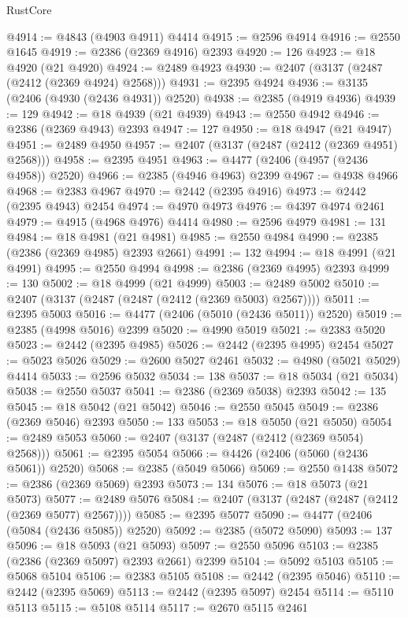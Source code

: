 \begin{lexlean}{RustCore}
\begin{coremodule}
@4914 := @4843 (@4903 @4911) @4414
@4915 := @2596 @4914
@4916 := @2550 @1645
@4919 := @2386 (@2369 @4916) @2393
@4920 := 126
@4923 := @18 @4920 (@21 @4920)
@4924 := @2489 @4923
@4930 := @2407 (@3137 (@2487 (@2412 (@2369 @4924) @2568)))
@4931 := @2395 @4924
@4936 := @3135 (@2406 (@4930 (@2436 @4931)) @2520)
@4938 := @2385 (@4919 @4936)
@4939 := 129
@4942 := @18 @4939 (@21 @4939)
@4943 := @2550 @4942
@4946 := @2386 (@2369 @4943) @2393
@4947 := 127
@4950 := @18 @4947 (@21 @4947)
@4951 := @2489 @4950
@4957 := @2407 (@3137 (@2487 (@2412 (@2369 @4951) @2568)))
@4958 := @2395 @4951
@4963 := @4477 (@2406 (@4957 (@2436 @4958)) @2520)
@4966 := @2385 (@4946 @4963) @2399
@4967 := @4938 @4966
@4968 := @2383 @4967
@4970 := @2442 (@2395 @4916)
@4973 := @2442 (@2395 @4943) @2454
@4974 := @4970 @4973
@4976 := @4397 @4974 @2461
@4979 := @4915 (@4968 @4976) @4414
@4980 := @2596 @4979
@4981 := 131
@4984 := @18 @4981 (@21 @4981)
@4985 := @2550 @4984
@4990 := @2385 (@2386 (@2369 @4985) @2393 @2661)
@4991 := 132
@4994 := @18 @4991 (@21 @4991)
@4995 := @2550 @4994
@4998 := @2386 (@2369 @4995) @2393
@4999 := 130
@5002 := @18 @4999 (@21 @4999)
@5003 := @2489 @5002
@5010 := @2407 (@3137 (@2487 (@2487 (@2412 (@2369 @5003) @2567))))
@5011 := @2395 @5003
@5016 := @4477 (@2406 (@5010 (@2436 @5011)) @2520)
@5019 := @2385 (@4998 @5016) @2399
@5020 := @4990 @5019
@5021 := @2383 @5020
@5023 := @2442 (@2395 @4985)
@5026 := @2442 (@2395 @4995) @2454
@5027 := @5023 @5026
@5029 := @2600 @5027 @2461
@5032 := @4980 (@5021 @5029) @4414
@5033 := @2596 @5032
@5034 := 138
@5037 := @18 @5034 (@21 @5034)
@5038 := @2550 @5037
@5041 := @2386 (@2369 @5038) @2393
@5042 := 135
@5045 := @18 @5042 (@21 @5042)
@5046 := @2550 @5045
@5049 := @2386 (@2369 @5046) @2393
@5050 := 133
@5053 := @18 @5050 (@21 @5050)
@5054 := @2489 @5053
@5060 := @2407 (@3137 (@2487 (@2412 (@2369 @5054) @2568)))
@5061 := @2395 @5054
@5066 := @4426 (@2406 (@5060 (@2436 @5061)) @2520)
@5068 := @2385 (@5049 @5066)
@5069 := @2550 @1438
@5072 := @2386 (@2369 @5069) @2393
@5073 := 134
@5076 := @18 @5073 (@21 @5073)
@5077 := @2489 @5076
@5084 := @2407 (@3137 (@2487 (@2487 (@2412 (@2369 @5077) @2567))))
@5085 := @2395 @5077
@5090 := @4477 (@2406 (@5084 (@2436 @5085)) @2520)
@5092 := @2385 (@5072 @5090)
@5093 := 137
@5096 := @18 @5093 (@21 @5093)
@5097 := @2550 @5096
@5103 := @2385 (@2386 (@2369 @5097) @2393 @2661) @2399
@5104 := @5092 @5103
@5105 := @5068 @5104
@5106 := @2383 @5105
@5108 := @2442 (@2395 @5046)
@5110 := @2442 (@2395 @5069)
@5113 := @2442 (@2395 @5097) @2454
@5114 := @5110 @5113
@5115 := @5108 @5114
@5117 := @2670 @5115 @2461

\end{coremodule}
\end{lexlean}
